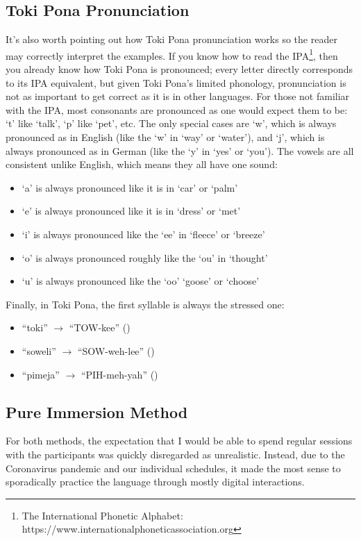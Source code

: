 \documentclass[a4paper,10pt]{article}
\begin{document}
\subsection{Toki Pona Pronunciation}
It's also worth pointing out how Toki Pona pronunciation works so the reader may correctly interpret
the examples. If you know how to read the IPA\footnote{The International Phonetic Alphabet:
https://www.internationalphoneticassociation.org}, then you
already know how Toki Pona is pronounced; every letter directly corresponds to its IPA equivalent,
but given Toki Pona's limited phonology, pronunciation is not as important to get correct as it is
in other languages. For those not familiar with the IPA, most consonants are pronounced as one
would expect them to be: `t' like `talk', `p' like `pet', etc. The only special cases are `w', which
is always pronounced as in English (like the `w' in `way' or `water'), and `j', which is always
pronounced as in German (like the `y' in `yes' or `you'). The vowels are all consistent unlike English,
which means they all have one sound:

\begin{itemize}
	\item `a' is always pronounced like it is in `car' or `palm'
	\item `e' is always pronounced like it is in `dress' or `met'
	\item `i' is always pronounced like the `ee' in `fleece' or `breeze'
	\item `o' is always pronounced roughly like the `ou' in `thought'
	\item `u' is always pronounced like the `oo' `goose' or `choose'
\end{itemize}

Finally, in Toki Pona, the first syllable is always the stressed one:

\begin{itemize}
	\item ``toki'' $\rightarrow$ ``TOW-kee'' ()
	\item ``soweli'' $\rightarrow$ ``SOW-weh-lee'' ()
	\item ``pimeja'' $\rightarrow$ ``PIH-meh-yah'' ()
\end{itemize}

\subsection{Pure Immersion Method}
For both methods, the expectation that I would be able to spend regular sessions with the participants
was quickly disregarded as unrealistic. Instead, due to the Coronavirus pandemic and our individual
schedules, it made the most sense to sporadically practice the language through mostly digital
interactions.
\end{document}
